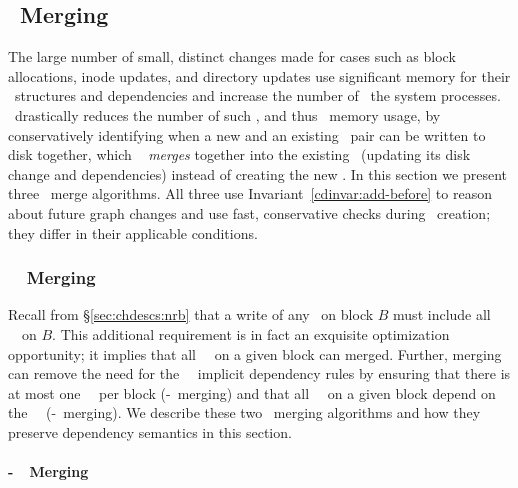 \subsection{\ChDesc\ Merging}
\label{sec:chdescs:merge}

The large number of small, distinct changes made for cases such as
block allocations, inode updates, and directory updates use
significant memory for their \chdesc\ structures and dependencies and
increase the number of \chdescs\ the system processes.
%
\Kudos\ drastically reduces the number of such \chdescs, and thus
\chdesc\ memory usage, by conservatively identifying when a new and an
existing \chdesc\ pair can be written to disk together, which \Kudos\
%
\emph{merges} together into the existing \chdesc\ (updating its disk
change and dependencies) instead of creating the new \chdesc.
%
In this section we present three \chdesc\ merge algorithms. All three
use Invariant~\ref{cdinvar:add-before} to reason about future graph
changes and use fast, conservative checks during \chdesc\ creation; they
differ in their applicable conditions.

\subsubsection{\Nrb\ \ChDesc\ Merging}
\label{sec:chdescs:merge:nrb}

Recall from \S\ref{sec:chdescs:nrb} that a write of any \chdescs\ on block
$B$ must include all \nrb\ \chdescs\ on $B$.
%
This additional requirement is in fact an exquisite optimization
opportunity; it implies that all \nrb\ \chdescs\ on a given block can
merged.
%
Further, merging can remove the need for the \nrb\ \chdesc\ implicit
dependency rules by ensuring that
%
there is at most one \nrb\ \chdesc\ per block (\nrb-\nrb\ merging)
%
and that all \rb\ \chdescs\ on a given block depend on the \nrb\ \chdesc\
(\nrb-\rb\ merging).
%
We describe these two \chdesc\ merging algorithms and how they
preserve dependency semantics in this section.

\paragraph{\Nrb-\Nrb\ \ChDesc\ Merging}
\label{sec:chdescs:merge:nrb:hard-hard}

